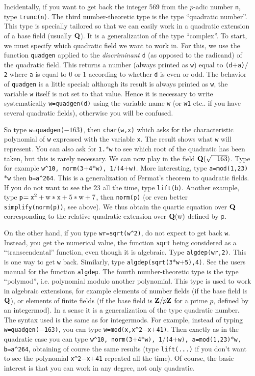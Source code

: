 Incidentally, if you want to get back the integer 569 from the $p$-adic number
{\tt n}, type {\tt trunc(n)}.
\smallskip
The third number-theoretic type is the type ``quadratic number''. This type
is specially tailored so that we can easily work in a quadratic extension
of a base field (usually $\Bbb Q$). It is a generalization of the type
``complex''. To start, we must specify which quadratic field we want to work
in. For this, we use the function {\tt quadgen} applied to the 
{\sl discriminant\/} {\tt d} (as opposed to the radicand) of the quadratic
field. This returns a number (always printed as {\tt w}) equal to
{\tt (d$+$a)$/$2} where {\tt a} is equal to 0 or 1 according to whether {\tt d}
is even or odd. The behavior of {\tt quadgen} is a little special: although
its result is always printed as {\tt w}, the variable {\tt w} itself is not
set to that value. Hence it is necessary to write systematically
{\tt w=quadgen(d)} using the variable name {\tt w} (or {\tt w1} etc.. if you
have several quadratic fields), otherwise you will be confused.

So type {\tt w=quadgen($-163$)}, then {\tt char(w,x)} which asks for the
characteristic polynomial of {\tt w} expressed with the variable {\tt x}.
The result shows what {\tt w} will represent. You can also ask for {\tt 1.$*$w}
to see which root of the quadratic has been taken, but this is rarely 
necessary. We can now play in the field $\Bbb Q(\sqrt{-163})$. Type for example
{\tt w\^{}10, norm(3$+$4$*$w), 1$/$(4$+$w)}. More interesting, type
{\tt a=mod(1,23)$*$w} then {\tt b=a\^{}264}. This is a generalization of Fermat's
theorem to quadratic fields. If you do not want to see the 23 all the time,
\def\x{{\tt x}}
type {\tt lift(b)}. Another example, type 
{\tt p$=\x^2+\text{w}*\x+5*\text{w}+7$}, then {\tt norm(p)} (or even
better {\tt simplify(norm(p))}, see above). We thus
obtain the quartic equation over $\Q$ corresponding to the relative quadratic
extension over $\Q(\text{w})$ defined by {\tt p}.

On the other hand, if you type {\tt wr=sqrt(w\^{}2)}, do not expect to get back
{\tt w}. Instead, you get the numerical value, the function {\tt sqrt} being
considered as a ``transcendental'' function, even though it is algebraic.
Type {\tt algdep(wr,2)}. This is one way to get {\tt w} back. Similarly,
type {\tt algdep(sqrt(3$*$w$+$5),4)}. See the users manual for the function
{\tt algdep}.
\smallskip
The fourth number-theoretic type is the type ``polymod'', i.e. polynomial
modulo another polynomial. This type is used to work in algebraic extensions,
for example elements of number fields (if the base field is $\Bbb Q$), or
elements of finite fields (if the base field is $\Z/p\Z$ for a prime $p$,
defined by an integermod). In a sense it is a generalization of the type
quadratic number. The syntax used is the same as for integermods.
For example, instead of typing {\tt w=quadgen($-$163)}, you can type
{\tt w=mod(x,x\^{}2$-$x$+$41)}. Then exactly as in the quadratic case you can
type {\tt w\^{}10, norm(3$+$4$*$w), 1$/$(4$+$w), a=mod(1,23)$*$w, b=a\^{}264},
obtaining of course the same results (type {\tt lift(...)} if you don't want
to see the polynomial {\tt x\^{}2$-$x$+$41} repeated all the time). Of course,
the basic interest is that you can work in any degree, not only quadratic.

